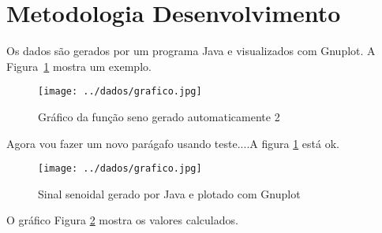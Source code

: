 \section{Metodologia
Desenvolvimento}

Os dados são gerados por um programa Java e visualizados com Gnuplot. A Figura~\ref{fig:grafico} mostra um exemplo.

\begin{figure}[htbp]
\centering
\texttt{[image: ../dados/grafico.jpg]}
\caption{Gráfico da função seno gerado automaticamente 2}
\label{fig:grafico}
\end{figure}

\vspace{5cm}

Agora vou fazer um novo parágafo usando teste....A figura \ref{fig:grafico} está ok.

\begin{figure}[htbp]
    \centering
    \texttt{[image: ../dados/grafico.jpg]}
    \caption{Sinal senoidal gerado por Java e plotado com Gnuplot}
    \label{fig:grafico_seno}
\end{figure}

O gráfico Figura \ref{fig:grafico_seno} mostra os valores calculados.
